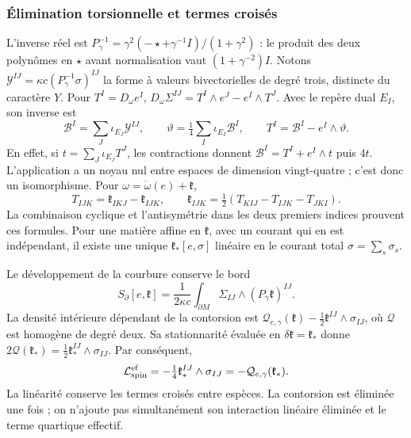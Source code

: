 \subsubsection{Élimination torsionnelle et termes croisés}
\label{hmtcuatro:gea:torsion}

L’inverse réel est $P_\gamma^{-1}=\gamma^2(-\star+\gamma^{-1}I)/(1+\gamma^2)$ : le produit des deux polynômes en $\star$ avant normalisation vaut $(1+\gamma^{-2})I$. Notons $\mathcal Y^{IJ}=\kappa c(P_\gamma^{-1}\sigma)^{IJ}$ la forme à valeurs bivectorielles de degré trois, distincte du caractère $Y$. Pour $T^I=D_\omega e^I$, $D_\omega\Sigma^{IJ}=T^I\wedge e^J-e^I\wedge T^J$. Avec le repère dual $E_I$, son inverse est
\[
\mathcal B^I=\sum_J\iota_{E_J}\mathcal Y^{IJ},\qquad
\vartheta=\tfrac14\sum_I\iota_{E_I}\mathcal B^I,\qquad
T^I=\mathcal B^I-e^I\wedge\vartheta.
\]
En effet, si $t=\sum_J\iota_{E_J}T^J$, les contractions donnent $\mathcal B^I=T^I+e^I\wedge t$ puis $4t$. L’application a un noyau nul entre espaces de dimension vingt-quatre ; c’est donc un isomorphisme. Pour $\omega=\mathring\omega(e)+\mathfrak k$,
\[
T_{IJK}=\mathfrak k_{IKJ}-\mathfrak k_{IJK},\qquad
\mathfrak k_{IJK}=\tfrac12(T_{KIJ}-T_{IJK}-T_{JKI}).
\]
La combinaison cyclique et l’antisymétrie dans les deux premiers indices prouvent ces formules. Pour une matière affine en $\mathfrak k$, avec un courant qui en est indépendant, il existe une unique $\mathfrak k_*[e,\sigma]$ linéaire en le courant total $\sigma=\sum_s\sigma_s$.

Le développement de la courbure conserve le bord
\[
S_\partial[e,\mathfrak k]=\frac1{2\kappa c}
\int_{\partial M}\Sigma_{IJ}\wedge(P_\gamma\mathfrak k)^{IJ}.
\]
La densité intérieure dépendant de la contorsion est $\mathcal Q_{e,\gamma}(\mathfrak k)
-\tfrac12\mathfrak k^{IJ}\wedge\sigma_{IJ}$, où $\mathcal Q$ est homogène de degré deux. Sa stationnarité évaluée en $\delta\mathfrak k=\mathfrak k_*$ donne $2\mathcal Q(\mathfrak k_*)=
\tfrac12\mathfrak k_*^{IJ}\wedge\sigma_{IJ}$. Par conséquent,
\begin{equation}
\mathcal L_{\rm spin}^{\rm ef}
=-\tfrac14\mathfrak k_*^{IJ}\wedge\sigma_{IJ}
=-\mathcal Q_{e,\gamma}(\mathfrak k_*).
\label{hmtcuatro:gea:spin}
\end{equation}
La linéarité conserve les termes croisés entre espèces. La contorsion est éliminée une fois ; on n’ajoute pas simultanément son interaction linéaire éliminée et le terme quartique effectif.

